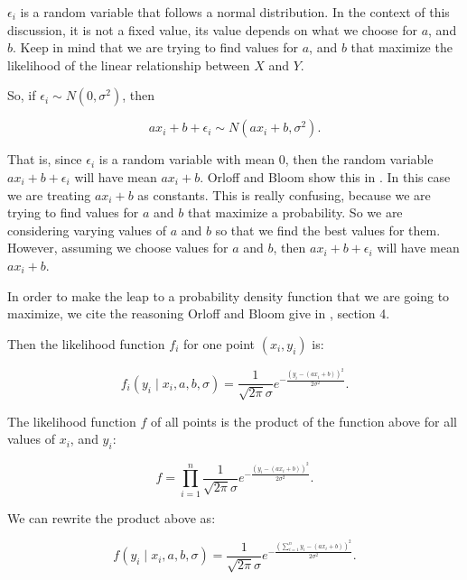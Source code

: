 \documentclass[a5paper,11pt]{article}
\begin{document}
$\epsilon_i$ is a random variable that follows a normal distribution.  In
the context of this discussion, it is not a fixed value, its value depends
on what we choose for $a$, and $b$.  Keep in mind that we are trying to find
values for $a$, and $b$ that maximize the likelihood of the linear relationship
between $X$ and $Y$.

So, if $\epsilon_i \sim N\left(0, \sigma^2\right)$, then 

\begin{equation}
ax_i + b + \epsilon_i \sim N\left(ax_i+b, \sigma^2 \right).
\end{equation}

That is, since $\epsilon_i$ is a random variable with mean $0$, then 
the random variable $ax_i+b + \epsilon_i$ will have mean $ax_i+b$.  Orloff
and Bloom show this in \cite{reading6a}.  In this case we are treating 
$ax_i + b$ as constants.  This is really confusing, because we are trying
to find values for $a$ and $b$ that maximize a probability. So we are 
considering varying values of $a$ and $b$ so that we find the best values
for them.  However, assuming we choose values for $a$ and $b$, then 
$ax_i+b+\epsilon_i$ will have mean $ax_i+b$.

In order to make the leap to a probability density function that we are
going to maximize, we cite the reasoning Orloff and Bloom give in 
\cite{reading10b}, section 4.

Then the likelihood function $f_i$ for one point $\left(x_i, y_i\right)$ is:

\begin{equation}
f_i\left(y_i \mid x_i, a, b, \sigma\right)
 = \frac{1}{\sqrt{2\pi}\sigma}
	e^{-\frac{\left(y_i -\left(ax_i+b\right)\right)^2}{2\sigma^2}}.
\end{equation}

The likelihood function $f$ of all points is the product of the function above
for all values of $x_i$, and $y_i$:

\begin{equation}
f
 = \prod_{i=1}^{n} \frac{1}{\sqrt{2\pi}\sigma}
	e^{-\frac{\left(y_i -\left(ax_i+b\right)\right)^2}{2\sigma^2}}.
\end{equation}

We can rewrite the product above as:

\begin{equation}
f\left(y_i \mid x_i, a, b, \sigma\right)
 =  \frac{1}{\sqrt{2\pi}\sigma}
	e^{-\frac{\left(\sum_{i=1}^{n} y_i -\left(ax_i+b\right)\right)^2}{2\sigma^2}}.
\end{equation}
\end{document}
